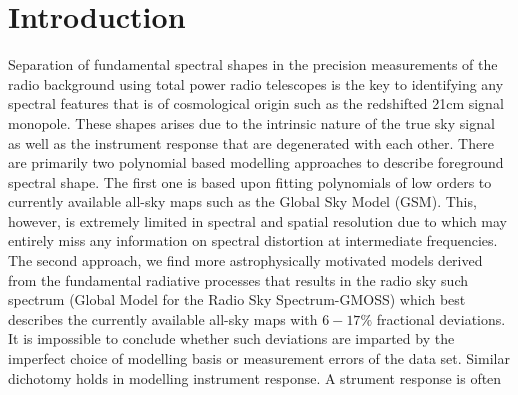 \documentclass{aastex62}
\begin{document}


\section{Introduction} \label{sec:intro}
Separation of fundamental spectral shapes in the precision measurements of the radio background using total power radio telescopes is the key to identifying any spectral features that is of cosmological origin such as the redshifted 21cm signal monopole. %
These shapes arises due to the intrinsic nature of the true sky signal as well as the instrument response that are degenerated with each other. There are primarily two polynomial based modelling approaches to describe  foreground spectral shape. The first one is based upon fitting polynomials of low orders to currently available all-sky maps such as the Global Sky Model (GSM). This, however, is extremely limited in spectral and spatial resolution due to which may entirely miss any information on spectral distortion at intermediate frequencies. The second approach, we find more astrophysically motivated models derived from the fundamental radiative processes that results in the radio sky such spectrum (Global Model for the Radio Sky Spectrum-GMOSS) which best describes the currently available all-sky maps with $6-17\%$ fractional deviations. It is impossible to conclude whether such deviations are imparted by the imperfect choice of modelling basis or measurement errors of the data set. Similar dichotomy holds in modelling instrument response. A strument response is often   
\end{document}
